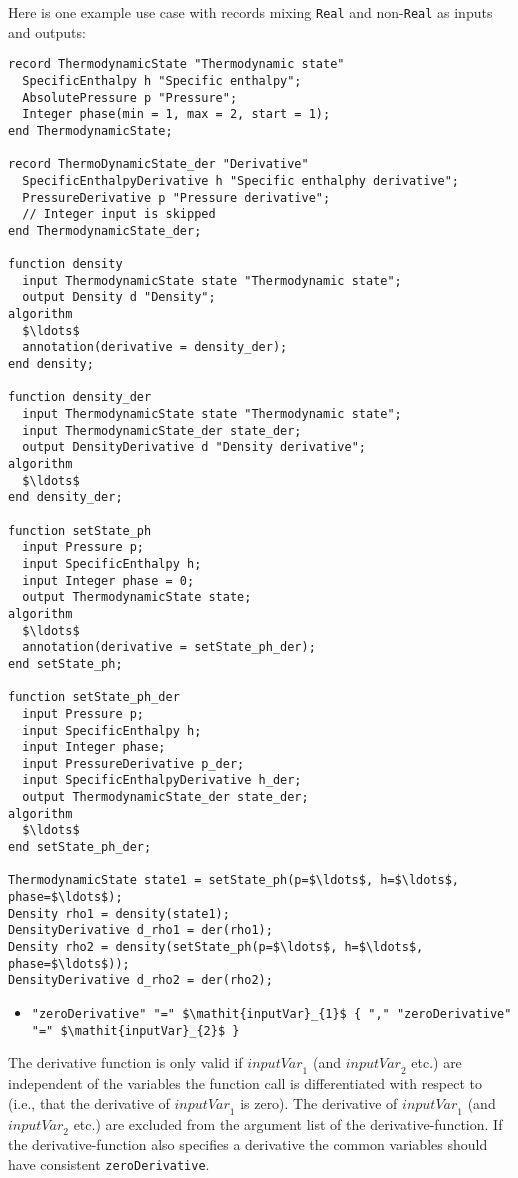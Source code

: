 \begin{example}
Here is one example use case with records mixing {\lstinline!Real!} and
non-{\lstinline!Real!} as inputs and outputs:
\begin{lstlisting}[language=modelica]
record ThermodynamicState "Thermodynamic state"
  SpecificEnthalpy h "Specific enthalpy";
  AbsolutePressure p "Pressure";
  Integer phase(min = 1, max = 2, start = 1);
end ThermodynamicState;

record ThermoDynamicState_der "Derivative"
  SpecificEnthalpyDerivative h "Specific enthalphy derivative";
  PressureDerivative p "Pressure derivative";
  // Integer input is skipped
end ThermodynamicState_der;

function density
  input ThermodynamicState state "Thermodynamic state";
  output Density d "Density";
algorithm
  $\ldots$
  annotation(derivative = density_der);
end density;

function density_der
  input ThermodynamicState state "Thermodynamic state";
  input ThermodynamicState_der state_der;
  output DensityDerivative d "Density derivative";
algorithm
  $\ldots$
end density_der;

function setState_ph
  input Pressure p;
  input SpecificEnthalpy h;
  input Integer phase = 0;
  output ThermodynamicState state;
algorithm
  $\ldots$
  annotation(derivative = setState_ph_der);
end setState_ph;

function setState_ph_der
  input Pressure p;
  input SpecificEnthalpy h;
  input Integer phase;
  input PressureDerivative p_der;
  input SpecificEnthalpyDerivative h_der;
  output ThermodynamicState_der state_der;
algorithm
  $\ldots$
end setState_ph_der;

ThermodynamicState state1 = setState_ph(p=$\ldots$, h=$\ldots$, phase=$\ldots$);
Density rho1 = density(state1);
DensityDerivative d_rho1 = der(rho1);
Density rho2 = density(setState_ph(p=$\ldots$, h=$\ldots$, phase=$\ldots$));
DensityDerivative d_rho2 = der(rho2);
\end{lstlisting}
\end{example}

\begin{itemize}
\item
  {\lstinline[language=grammar]!"zeroDerivative" "=" $\mathit{inputVar}_{1}$ { "," "zeroDerivative" "=" $\mathit{inputVar}_{2}$ }!}
\end{itemize}

The derivative function is only valid if $\mathit{inputVar}_{1}$ (and $\mathit{inputVar}_{2}$ etc.) are independent of the variables the function call is differentiated with respect to (i.e., that the derivative of $\mathit{inputVar}_{1}$ is zero).
The derivative of $\mathit{inputVar}_{1}$ (and $\mathit{inputVar}_{2}$ etc.) are excluded from the argument list of the derivative-function.
If the derivative-function also specifies a derivative the common variables should have consistent {\lstinline!zeroDerivative!}.

